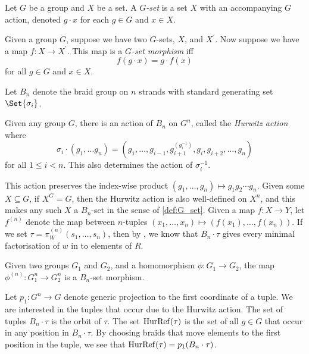 \begin{definition}
	\label{def:G_set}
	Let $G$ be a group and $X$ be a set.
	A \emph{$G$-set} is a set  $X$ with an accompanying  $G$ action, denoted  $g \cdot x$ for each  $g \in G$ and  $x \in X$.
\end{definition}
\begin{definition}
	Given a group $G$, suppose we have two $G$-sets,  $X$, and $X^\prime$.
	Now suppose we have a map  $f \colon X \to X^\prime$.
	This map is a \emph{$G$-set morphism} iff
	\[
		f(g \cdot x) = g \cdot f(x)
	\]
	for all $g \in G$ and  $x \in X$.
\end{definition}

Let  $B_n$ denote the braid group on  $n$ strands with standard generating set $\Set{\sigma_i}$.
\begin{definition}
	Given any group $G$, there is an action of  $B_n$ on  $G^n$, called the \emph{Hurwitz action} where
	\[
		\sigma_i \cdot  \left( g_1, \ldots g_n \right) = \left( g_1,\ldots,g_{i-1}, g_{i+1}^{\left(g_i^{-1}\right)}, g_{i}, g_{i+2}, \ldots, g_n \right)
	\]
	for all $1\leq i<n$.
	This also determines the action of $\sigma_i^{-1}$.
\end{definition}
This action preserves the index-wise product $(g_1, \ldots, g_n) \mapsto g_1g_2\cdots g_n$.
Given some $X \subseteq G$, if $X^G = G$, then the Hurwitz action is also well-defined on $X^n$, and this makes any such $X$ a  $B_n$-set in the sense of \cref{def:G_set}.
Given a map $f \colon X \to Y$, let  $f^{(n)}$ denote the map between $n$-tuples $(x_1,\ldots,x_n)\mapsto (f(x_1),\ldots,f(x_n))$.
If we set $\tau = \pi^{(n)}_W(s_1,\ldots,s_n)$, then by \cite{igusa_schiffler_exceptional_2010}, we know that $B_n \cdot \tau$ gives every minimal factorisation of  $w$ in to elements of $R$.

\begin{remark}
	\label{rmk:hurwitz_action_Bn_set_morphism}
	Given two groups $G_1$ and  $G_2$, and a homomorphism $\phi \colon G_1 \to G_2$, the map $\phi^{(n)} \colon G_1^n \to G_2^n$ is a  $B_n$-set morphism.
\end{remark}
Let $p_1 \colon G^n \to G$ denote generic projection to the first coordinate of a tuple.
We are interested in the tuples that occur due to the Hurwitz action.
The set of tuples $B_n \cdot \tau$ is the orbit of $\tau$.
The set $\operatorname{HurRef}(\tau)$ is the set of all  $g \in G$ that occur in any position in  $B_n \cdot \tau$.
By choosing braids that move elements to the first position in the tuple, we see that $\operatorname{HurRef}(\tau) = p_1(B_n \cdot \tau)$.

